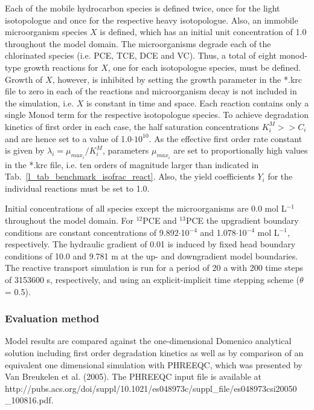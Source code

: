 Each of the mobile hydrocarbon species is defined twice, once for the light isotopologue and once for the respective heavy isotopologue. Also, an immobile microorganism species $X$ is defined, which has an initial unit concentration of 1.0 throughout the model domain. The microorganisms degrade each of the chlorinated species (i.e. PCE, TCE, DCE and VC). Thus, a total of eight monod-type growth reactions for $X$, one for each isotopologue species, must be defined. Growth of $X$, however, is inhibited by setting the growth parameter in the *.krc file to zero in each of the reactions and microorganism decay is not included in the simulation, i.e. $X$ is constant in time and space. Each reaction contains only a single Monod term for the respective isotopologue species. To achieve degradation kinetics of first order in each case, the half saturation concentrations $K^M_i >> C_i$ and are hence set to a value of 1.0$\cdot 10^{10}$. As the effective first order rate constant is given by $\lambda_i = \mu_{max_i} / K^M_i$, parameters $\mu_{max_i}$ are set to proportionally high values in the *.krc file, i.e. ten orders of magnitude larger than indicated in Tab.~\ref{l_tab_benchmark_isofrac_react}. Also, the yield coefficients $Y_i$ for the individual reactions must be set to 1.0.

Initial concentrations of all species except the microorganisms are 0.0 mol L$^{-1}$ throughout the model domain. For $^{12}$PCE and $^{13}$PCE the upgradient boundary conditions are constant concentrations of 9.892$\cdot$10$^{-4}$ and 1.078$\cdot$10$^{-4}$ mol L$^{-1}$, respectively. The hydraulic gradient of 0.01 is induced by fixed head boundary conditions of 10.0 and 9.781 m at the up- and downgradient model boundaries. The reactive transport simulation is run for a period of 20 a with 200 time steps of 3153600 s, respectively, and using an explicit-implicit time stepping scheme ($\theta$ = 0.5).

\subsubsection*{Evaluation method}

Model results are compared against the one-dimensional Domenico analytical solution including first order degradation kinetics as well as by comparison of an equivalent one dimensional simulation with PHREEQC, which was presented by Van Breukelen et al. (2005). The PHREEQC input file is available at http://pubs.acs.org/doi/suppl/10.1021/es048973c/suppl\_file/es048973csi20050 \_100816.pdf.

